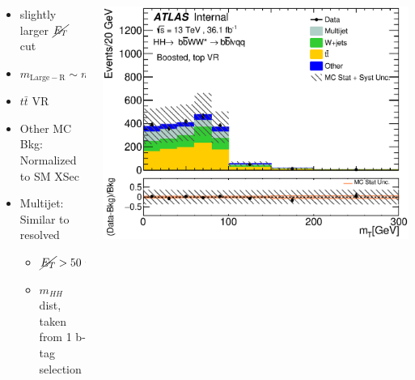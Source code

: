 \documentclass{beamer}
\newcommand*{\ttbar}{\ensuremath{t\bar{t}}\xspace}
\newcommand*{\met}{\ensuremath{\cancel{E_{T}}}\xspace}
\newcommand*{\header}[1]{\fontsize{16}{8}\selectfont \textbf{{\color{MyPurple}{#1}}}}
\begin{document}
\begin{frame}
\begin{center}
\header{Boosted Analysis}
\end{center}
\begin{columns}
\begin{column}{0.5\textwidth}
\color{MyPurple}{Signal Region}
\begin{itemize}
\footnotesize
\item slightly larger \met cut
\item $m_{\mathrm{Large-R}}\sim{}m_{H}$
\end{itemize}
\color{MyPurple}{Background Modeling}
\begin{itemize}
\footnotesize
\item \ttbar VR
\item Other MC Bkg: Normalized to SM XSec
\item Multijet: Similar to resolved
\begin{itemize}
\scriptsize
\item $\met > 50 \text{ GeV}$
\item $m_{HH}$ dist, taken from 1 b-tag selection
\end{itemize}
\end{itemize}
\end{column}
\begin{column}{0.5\textwidth}

\begin{center}
\includegraphics[width=1\textwidth]{figures/C_2tab_0bjet_mbbcr_lepton_presel_met50_WlepMtATLAS}
\end{center}
\end{column}
\end{columns}
\end{frame}
\end{document}
